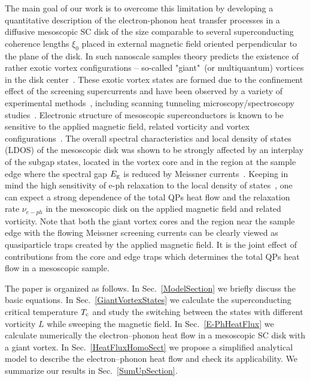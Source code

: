 \documentclass[prx,twocolumn,aps,superscriptaddress,showpacs,amsmath,amssymb,footnoteinbib]{revtex4-1}
\begin{document}
The main goal of our work is to overcome this limitation by developing a quantitative description
of the electron-phonon heat transfer processes in a diffusive
mesoscopic SC disk of the size comparable to several
superconducting coherence lengths $\xi_0$ placed in external
magnetic field oriented perpendicular to the plane of the disk. In
such nanoscale samples theory predicts the existence of rather
exotic vortex configurations -- so-called "giant"\ (or
multiquantum) vortices in the disk center~\cite{Peeters-Nature97,geim}. These exotic vortex states are
formed due to the confinement effect of the screening
supercurrents and have been observed by a variety of experimental
methods~\cite{Peeters-Nature97,geim,Moshchalkov-PRB04,Moshchalkov-PRB08,Grigorieva,Kokubo-PRB10},
including scanning tunneling microscopy/spectroscopy studies~\cite{Peeters-PRL04,Roditchev-PRL09,Roditchev-PRL11,Nishio-PRL08,Moshchalkov-PRB16,Hess-PRL89}.
Electronic structure of mesoscopic superconductors is known to be
sensitive to the applied magnetic field, related vorticity and
vortex configurations~\cite{tanaka1,virt,tanaka3,Melnikov-PRL05,mrs1,mrs2,Peeters-PRL11}. %
The overall spectral characteristics and local density of states
(LDOS) of the mesoscopic disk was shown to be strongly affected by
an interplay of the subgap states, located in the vortex core and
in the region at the sample edge where the spectral gap $E_{\rm
g}$ is reduced by Meissner currents~\cite{Samokhvalov-PRB19-DOS}.
Keeping in mind the high sensitivity of e-ph relaxation to the
local density of states~\cite{Taupin-Khaymovich-NatCom16}, one can
expect a strong dependence of the total QPs heat flow and the
relaxation rate $\nu_{e-ph}$ in the mesoscopic disk on the applied
magnetic field and related vorticity.  Note that both the giant
vortex cores and the region near the sample edge with the flowing
Meissner screening currents can be clearly viewed as quasiparticle
traps created by the applied magnetic field. It is the joint
effect of contributions from the core and edge traps which determines
the total QPs heat flow in a mesoscopic sample.


The paper is organized as follows. In Sec.~\ref{ModelSection} we
briefly discuss the basic equations. In
Sec.~\ref{GiantVortexStates} we calculate the superconducting
critical temperature $T_{\rm c}$ and study the switching between
the states with different vorticity $L$ while sweeping the
magnetic field. In Sec.~\ref{E-PhHeatFlux} we calculate
numerically the electron--phonon heat flow in a mesoscopic SC disk
with a giant vortex.  In Sec.~\ref{HeatFluxHomoSect} we propose a
simplified analytical model to describe the electron--phonon heat
flow and check its applicability. We summarize our results in
Sec.~\ref{SumUpSection}.
\end{document}
